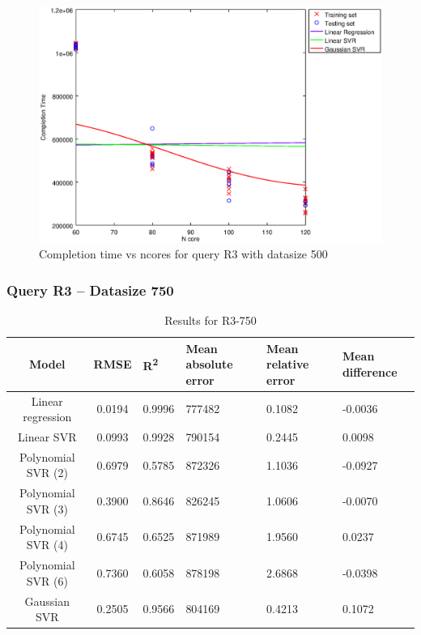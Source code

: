 \documentclass[a4paper,11pt]{article}
\begin{document}
\begin {figure}[hbtp]
\centering
\includegraphics[width=\textwidth]{output/R3_500_LINEAR_NCORE/plot_R3_500_bestmodels.eps}
\caption{Completion time vs ncores for query R3 with datasize 500}
\label{fig:all_linear_R3_500}
\end {figure}

\newpage
\subsubsection{Query R3 -- Datasize 750}
\begin{table}[H]
	\centering
	\begin{adjustbox}{center}
		\begin{tabular}{c | c M{1.2cm} M{2.5cm} M{2.5cm} M{1.8cm}}
			Model & RMSE & R\textsuperscript{2} & Mean absolute error & Mean relative error & Mean difference \tabularnewline
			\hline
			Linear regression & 0.0194 & 0.9996 & 777482 & 0.1082 & -0.0036 \\
			Linear SVR & 0.0993 & 0.9928 & 790154 & 0.2445 & 0.0098 \\
			Polynomial SVR (2) & 0.6979 & 0.5785 & 872326 & 1.1036 & -0.0927 \\
			Polynomial SVR (3) & 0.3900 & 0.8646 & 826245 & 1.0606 & -0.0070 \\
			Polynomial SVR (4) & 0.6745 & 0.6525 & 871989 & 1.9560 & 0.0237 \\
			Polynomial SVR (6) & 0.7360 & 0.6058 & 878198 & 2.6868 & -0.0398 \\
			Gaussian SVR & 0.2505 & 0.9566 & 804169 & 0.4213 & 0.1072 \\
		\end{tabular}
	\end{adjustbox}
	\\
	\caption{Results for R3-750}
	\label{fig:all_linear_R3_750}
\end{table}
\end{document}
